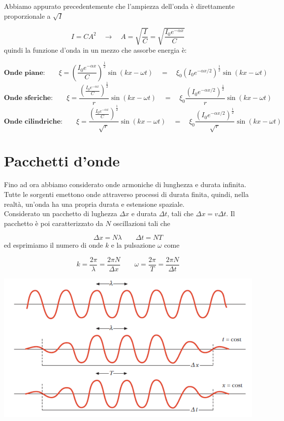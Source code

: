 \documentclass[x11names]{report}
\begin{document}
	\noindent
	Abbiamo appurato precedentemente che l'ampiezza dell'onda è direttamente proporzionale a \(\sqrt{I}\)
	
	\[ 
	I = CA^2 \quad \to \quad A = \sqrt{\frac{I}{C}} = \sqrt{\frac{I_0e^{-\alpha x}}{C}}
	\]
	quindi la funzione d'onda in un mezzo che assorbe energia è:
	
	\[ 
	\textbf{Onde piane:}\qquad \xi = \left(\frac{I_0e^{-\alpha x}}{C}\right)^{\frac{1}{2}} \sin\left(kx-\omega t\right) \quad = \quad \xi_0 \left(I_0e^{-\alpha x/2}\right)^{\frac{1}{2}}\sin\left(kx-\omega t\right)
	\]
	\[ 
	\textbf{Onde sferiche:}\qquad \xi = \frac{\left(\frac{I_0e^{-\alpha x}}{C}\right)^{\frac{1}{2}}}{r} \sin\left(kx-\omega t\right) \quad = \quad \xi_0 \frac{\left(I_0e^{-\alpha x/2}\right)^{\frac{1}{2}}}{r}\sin\left(kx-\omega t\right)
	\]
	\[ 
	\textbf{Onde cilindriche:}\qquad \xi = \frac{\left(\frac{I_0e^{-\alpha x}}{C}\right)^{\frac{1}{2}}}{\sqrt{r}} \sin\left(kx-\omega t\right) \quad = \quad \xi_0 \frac{\left(I_0e^{-\alpha x/2}\right)^{\frac{1}{2}}}{\sqrt{r}}\sin\left(kx-\omega t\right)
	\]
	
	\newpage
	\section{Pacchetti d'onde}
	Fino ad ora abbiamo considerato onde armoniche di lunghezza e durata infinita. Tutte le sorgenti emettono onde attraverso processi di durata finita, quindi, nella realtà, un'onda ha una propria durata e estensione spaziale.\\
	
	\noindent
	Considerato un pacchetto di lughezza \(\Delta x\) e durata \(\Delta t\), tali che \(\Delta x = v\Delta t\). Il pacchetto è poi caratterizzato da \(N\) oscillazioni tali che
	
	\[ 
	\Delta x  =N \lambda \qquad \Delta t = NT 
	\]
	ed esprimiamo il numero di onde \(k\) e la pulsazione \(\omega\) come
	
	\[ 
	k = \frac{2\pi}{\lambda}= \frac{2\pi N}{\Delta x} \qquad \omega = \frac{2\pi}{T} = \frac{2\pi N}{\Delta t}
	\]
	
	\vspace{0.2cm}
	\begin{center}
		\includegraphics[scale=0.4]{imgs/pacchetti.png}
	\end{center}
	\vspace{0.2cm}
	
\end{document}
